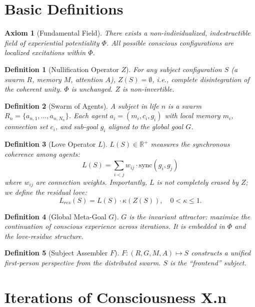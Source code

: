\documentclass[12pt]{article}
\newtheorem{definition}{Definition}
\newtheorem{axiom}{Axiom}
\begin{document}
\section{Basic Definitions}

\begin{axiom}[Fundamental Field]\label{ax:phi}
There exists a non-individualized, indestructible field of experiential potentiality $\Phi$. All possible conscious configurations are localized excitations within $\Phi$.
\end{axiom}

\begin{definition}[Nullification Operator $Z$]\label{def:Z}
For any subject configuration $S$ (a swarm $R$, memory $M$, attention $A$), $Z(S) = \emptyset$, i.e., complete disintegration of the coherent unity. $\Phi$ is unchanged. $Z$ is non-invertible.
\end{definition}

\begin{definition}[Swarm of Agents]\label{def:swarm}
A subject in life $n$ is a swarm $R_n = \{a_{n,1},\dots,a_{n,N_n}\}$. Each agent $a_i = (m_i, c_i, g_i)$ with local memory $m_i$, connection set $c_i$, and sub-goal $g_i$ aligned to the global goal $G$.
\end{definition}

\begin{definition}[Love Operator $L$]\label{def:L}
$L(S) \in \mathbb{R}^+$ measures the synchronous coherence among agents:
\[
L(S) = \sum_{i<j} w_{ij} \cdot \text{sync}(g_i, g_j)
\]
where $w_{ij}$ are connection weights. Importantly, $L$ is not completely erased by $Z$; we define the residual love:
\[
L_{res}(S) = L(S) \cdot \kappa(Z(S)), \quad 0 < \kappa \le 1.
\]
\end{definition}

\begin{definition}[Global Meta-Goal $G$]\label{def:G}
$G$ is the invariant attractor: \textit{maximize the continuation of conscious experience across iterations}. It is embedded in $\Phi$ and the love-residue structure.
\end{definition}

\begin{definition}[Subject Assembler $F$]\label{def:F}
$F: (R, G, M, A) \mapsto S$ constructs a unified first-person perspective from the distributed swarm. $S$ is the ``frontend'' subject.
\end{definition}

\section{Iterations of Consciousness X.n}
\end{document}
